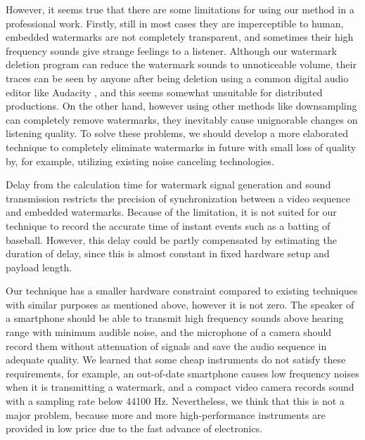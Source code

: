 However, it seems true that there are some limitations for using our method in a professional work.
Firstly, still in most cases they are imperceptible to human, embedded watermarks are not completely transparent, and sometimes their high frequency sounds give strange feelings to a listener.
Although our watermark deletion program can reduce the watermark sounds to unnoticeable volume, their traces can be seen by anyone after being deletion using a common digital audio editor like Audacity \cite{audacity}, and this seems somewhat unsuitable for distributed productions.
On the other hand, however using other methods like downsampling can completely remove watermarks, they inevitably cause unignorable changes on listening quality.
To solve these problems, we should develop a more elaborated technique to completely eliminate watermarks in future with small loss of quality by, for example, utilizing existing noise canceling technologies.

Delay from the calculation time for watermark signal generation and sound transmission restricts the precision of synchronization between a video sequence and embedded watermarks.
Because of the limitation, it is not suited for our technique to record the accurate time of instant events such as a batting of baseball.
However, this delay could be partly compensated by estimating the duration of delay, since this is almost constant in fixed hardware setup and payload length.

Our technique has a smaller hardware constraint compared to existing techniques with similar purposes as mentioned above, however it is not zero.
The speaker of a smartphone should be able to transmit high frequency sounds above hearing range with minimum audible noise, and the microphone of a camera should record them without attenuation of signals and save the audio sequence in adequate quality.
We learned that some cheap instruments do not satisfy these requirements, for example, an out-of-date smartphone causes low frequency noises when it is transmitting a watermark, and a compact video camera records sound with a sampling rate below 44100 Hz.
Nevertheless, we think that this is not a major problem, because more and more high-performance instruments are provided in low price due to the fast advance of electronics.
